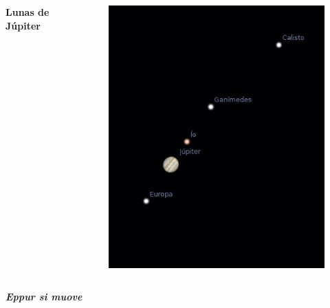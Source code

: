 \documentclass{beamer}
\begin{document}
\begin{frame}
 \begin{columns}
  \begin{center}
  \Huge
  \textbf{Lunas de Júpiter}
  \end{center}
   \begin{figure}
    \centering
    \includegraphics[scale=0.5]{Imagenes/Lunas_jupiter}
  \end{figure}
 \end{columns}
\end{frame}


\begin{frame}
\begin{center}
\Huge
\textbf{\textit{Eppur si muove}}
\end{center}
\end{frame}


\end{document}
